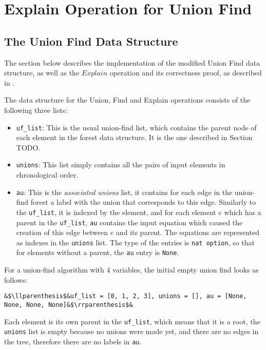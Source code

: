 
\chapter{Explain Operation for Union Find}\label{chapter:union_find}

\section{The Union Find Data Structure}


The section below describes the implementation of the modified Union Find data structure, as well as the $Explain$ operation and its correctness proof, as described in \cite{Nieuwenhuis}.

The data structure for the Union, Find and Explain operations consists of the following three lists:

\begin{itemize}
	\item \lstinline{uf_list}: This is the usual union-find list, which contains the parent node of each element in the forest data structure. It is the one described in Section TODO.
	
	\item \lstinline{unions}: This list simply contains all the pairs of input elements in chronological order. 
	
	\item \lstinline{au}: This is the \emph{associated unions} list,  it contains for each edge in the union-find forest a label with the union that corresponds to this edge. Similarly to the \lstinline{uf_list}, it is indexed by the element, and for each element $e$ which has a parent in the \lstinline{uf_list}, \lstinline{au} contains the input equation which caused the creation of this edge between $e$ and its parent. The equations are represented as indexes in the \lstinline{unions} list. The type of the entries is \lstinline{nat option}, so that for elements without a parent, the \lstinline{au} entry is \lstinline{None}.
\end{itemize}

\begin{exmp}\label{empty_ufe}
For a union-find algorithm with 4 variables, the initial empty union find looks as follows: 
\begin{lstlisting}
&$\llparenthesis$&uf_list = [0, 1, 2, 3], unions = [], au = [None, None, None, None]&$\rrparenthesis$&
\end{lstlisting}
Each element is its own parent in the \lstinline{uf_list}, which means that it is a root, the \lstinline{unions} list is empty because no unions were made yet, and there are no edges in the tree, therefore there are no labels in \lstinline{au}.
\end{exmp}

